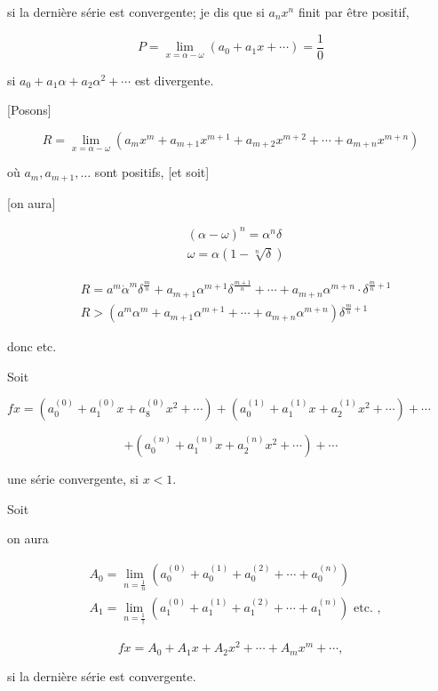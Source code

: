 \documentclass{article}
\begin{document}
si la dernière série est convergente; je dis que si \(a_{n} x^{n}\) finit par être positif,

\[
P=\lim _{x=\alpha-\omega}\left(a_{0}+a_{1} x+\cdots\right)=\frac{1}{0}
\]

si \(a_{0}+a_{1} \alpha+a_{2} \alpha^{2}+\cdots\) est divergente.

[Posons]

\[
R=\lim _{x=\alpha-\omega}\left(a_{m} x^{m}+a_{m+1} x^{m+1}+a_{m+2} x^{m+2}+\cdots+a_{m+n} x^{m+n}\right)
\]

où \(a_{m}, a_{m+1}, \ldots\) sont positifs, [et soit]

[on aura]

\[
\begin{aligned}
& (\alpha-\omega)^{n}=\alpha^{n} \delta \\
& \omega=\alpha(1-\sqrt[n]{\delta})
\end{aligned}
\]

\[
\begin{aligned}
& R=a^{m} \dot{\alpha}^{m} \delta^{\frac{m}{n}}+a_{m+1} \alpha^{m+1} \delta^{\frac{m+1}{n}}+\cdots+a_{m+n} \alpha^{m+n} \cdot \delta^{\frac{m}{n}+1} \\
& R>\left(a^{m} \alpha^{m}+a_{m+1} \alpha^{m+1}+\cdots+a_{m+n} \alpha^{m+n}\right) \delta^{\frac{m}{n}+1}
\end{aligned}
\]

donc etc.

Soit

\(f x=\left(a_{0}^{(0)}+a_{1}^{(0)} x+a_{8}^{(0)} x^{2}+\cdots\right)+\left(a_{0}^{(1)}+a_{1}^{(1)} x+a_{2}^{(1)} x^{2}+\cdots\right)+\cdots\)

\[
+\left(a_{0}^{(n)}+a_{1}^{(n)} x+a_{2}^{(n)} x^{2}+\cdots\right)+\cdots
\]

une série convergente, si \(x<1\).

Soit

on aura

\[
\begin{aligned}
& A_{0}=\lim _{n=\frac{1}{n}}\left(a_{0}^{(0)}+a_{0}^{(1)}+a_{0}^{(2)}+\cdots+a_{0}^{(n)}\right) \\
& A_{1}=\lim _{n=\frac{1}{\dagger}}\left(a_{1}^{(0)}+a_{1}^{(1)}+a_{1}^{(2)}+\cdots+a_{1}^{(n)}\right) \text { etc. },
\end{aligned}
\]

\[
f x=A_{0}+A_{1} x+A_{2} x^{2}+\cdots+A_{m} x^{m}+\cdots,
\]

si la dernière série est convergente.
\end{document}
